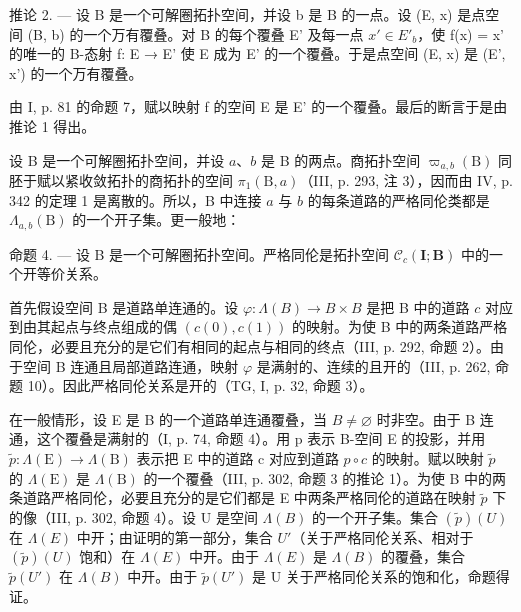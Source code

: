 推论 2. --- 设 B 是一个可解圈拓扑空间，并设 b 是 B 的一点。设 (E, x) 是点空间 (B, b) 的一个万有覆叠。对 B 的每个覆叠 E' 及每一点 \(x' \in E'_{b}\)，使 f(x) = x' 的唯一的 B-态射 f: E → E' 使 E 成为 E' 的一个覆叠。于是点空间 (E, x) 是 (E', x') 的一个万有覆叠。

由 I, p. 81 的命题 7，赋以映射 f 的空间 E 是 E' 的一个覆叠。最后的断言于是由推论 1 得出。

设 B 是一个可解圈拓扑空间，并设 \(a\)、\(b\) 是 B 的两点。商拓扑空间 \(\varpi_{a,b}(\mathrm{B})\) 同胚于赋以紧收敛拓扑的商拓扑的空间 \(\pi_1(\mathrm{B},a)\)（III, p. 293, 注 3），因而由 IV, p. 342 的定理 1 是离散的。所以，B 中连接 \(a\) 与 \(b\) 的每条道路的严格同伦类都是 \(\Lambda_{a,b}(\mathrm{B})\) 的一个开子集。更一般地：

命题 4. --- 设 B 是一个可解圈拓扑空间。严格同伦是拓扑空间 \(\mathcal{C}_{c}(\mathbf{I};\mathbf{B})\) 中的一个开等价关系。

首先假设空间 B 是道路单连通的。设 \(\varphi\colon\Lambda(B)\to B\times B\) 是把 B 中的道路 \(c\) 对应到由其起点与终点组成的偶 \((c(0),c(1))\) 的映射。为使 B 中的两条道路严格同伦，必要且充分的是它们有相同的起点与相同的终点（III, p. 292, 命题 2）。由于空间 B 连通且局部道路连通，映射 \(\varphi\) 是满射的、连续的且开的（III, p. 262, 命题 10）。因此严格同伦关系是开的（TG, I, p. 32, 命题 3）。

在一般情形，设 E 是 B 的一个道路单连通覆叠，当 \(B \neq \varnothing\) 时非空。由于 B 连通，这个覆叠是满射的（I, p. 74, 命题 4）。用 p 表示 B-空间 E 的投影，并用 \(\widetilde{p} \colon \Lambda(\mathrm{E}) \to \Lambda(\mathrm{B})\) 表示把 E 中的道路 c 对应到道路 \(p \circ c\) 的映射。赋以映射 \(\widetilde{p}\) 的 \(\Lambda(\mathrm{E})\) 是 \(\Lambda(\mathrm{B})\) 的一个覆叠（III, p. 302, 命题 3 的推论 1）。为使 B 中的两条道路严格同伦，必要且充分的是它们都是 E 中两条严格同伦的道路在映射 \(\widetilde{p}\) 下的像（III, p. 302, 命题 4）。设 U 是空间 \(\Lambda(B)\) 的一个开子集。集合 \((\widetilde{p})(U)\) 在 \(\Lambda(E)\) 中开；由证明的第一部分，集合 \(U'\)（关于严格同伦关系、相对于 \((\widetilde{p})(U)\) 饱和）在 \(\Lambda(E)\) 中开。由于 \(\Lambda(E)\) 是 \(\Lambda(B)\) 的覆叠，集合 \(\widetilde{p}(U')\) 在 \(\Lambda(B)\) 中开。由于 \(\widetilde{p}(U')\) 是 U 关于严格同伦关系的饱和化，命题得证。

